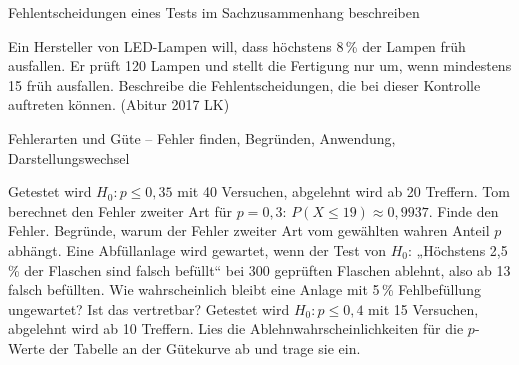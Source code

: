 \begin{aufgabe}{Fehlentscheidungen eines Tests im Sachzusammenhang beschreiben}
\begin{teile}
\teil Ein Hersteller von LED-Lampen will, dass höchstens 8\,\% der Lampen früh ausfallen. Er prüft 120 Lampen und stellt die Fertigung nur um, wenn mindestens 15 früh ausfallen. Beschreibe die Fehlentscheidungen, die bei dieser Kontrolle auftreten können. \hfill (Abitur 2017 LK)
\end{teile}
\end{aufgabe}

\begin{aufgabe}{Fehlerarten und Güte – Fehler finden, Begründen, Anwendung, Darstellungswechsel}
\begin{teile}
\teil Getestet wird $H_0\colon p \le 0{,}35$ mit 40 Versuchen, abgelehnt wird ab 20 Treffern. Tom berechnet den Fehler zweiter Art für $p = 0{,}3$: $P(X \le 19) \approx 0{,}9937$. Finde den Fehler.
\teil Begründe, warum der Fehler zweiter Art vom gewählten wahren Anteil $p$ abhängt.
\teil Eine Abfüllanlage wird gewartet, wenn der Test von $H_0$: „Höchstens 2,5\,\% der Flaschen sind falsch befüllt“ bei 300 geprüften Flaschen ablehnt, also ab 13 falsch befüllten. Wie wahrscheinlich bleibt eine Anlage mit 5\,\% Fehlbefüllung ungewartet? Ist das vertretbar?
\teil Getestet wird $H_0\colon p \le 0{,}4$ mit 15 Versuchen, abgelehnt wird ab 10 Treffern. Lies die Ablehnwahrscheinlichkeiten für die $p$-Werte der Tabelle an der Gütekurve ab und trage sie ein.

\begin{ksys}[xmin=0,xmax=1,ymin=0,ymax=1,xstep=0.1,ystep=0.1,ablesen,xlabel=$p$]\end{ksys} 
\end{teile}
\end{aufgabe}
